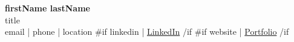 \documentclass[11pt,a4paper]{article}
\begin{document}
\begin{center}
    {\LARGE\bfseries {{firstName}} {{lastName}}}\\[0.3em]
    {\large {{title}}}\\[0.3em]
    \small{
        {{email}} | {{phone}} | {{location}}
        {{#if linkedin}}
            | \href{ {{linkedin}} }{LinkedIn}
        {{/if}}
        {{#if website}}
            | \href{ {{website}} }{Portfolio}
        {{/if}}
    }
\end{center}

\end{document}
